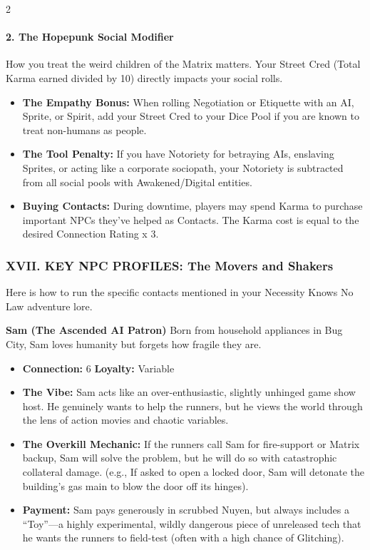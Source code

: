 \documentclass[
  oneside]{article}
\providecommand{\tightlist}{%
  \setlength{\itemsep}{0pt}\setlength{\parskip}{0pt}}
\begin{document}
\begin{multicols}{2}
\hypertarget{the-hopepunk-social-modifier}{%
\paragraph{2. The Hopepunk Social
Modifier}\label{the-hopepunk-social-modifier}}

How you treat the weird children of the Matrix
matters. Your Street Cred (Total Karma earned
divided by 10) directly impacts your social rolls.

\begin{itemize}
\tightlist
\item
  \textbf{The Empathy Bonus:} When rolling
  Negotiation or Etiquette with an AI, Sprite, or
  Spirit, add your Street Cred to your Dice Pool
  if you are known to treat non-humans as people.
\item
  \textbf{The Tool Penalty:} If you have Notoriety
  for betraying AIs, enslaving Sprites, or acting
  like a corporate sociopath, your Notoriety is
  subtracted from all social pools with
  Awakened/Digital entities.
\item
  \textbf{Buying Contacts:} During downtime,
  players may spend Karma to purchase important
  NPCs they've helped as Contacts. The Karma cost
  is equal to the desired Connection Rating x 3.
\end{itemize}

\hypertarget{xvii.-key-npc-profiles-the-movers-and-shakers}{%
\subsubsection{XVII. KEY NPC PROFILES: The Movers
and
Shakers}\label{xvii.-key-npc-profiles-the-movers-and-shakers}}

Here is how to run the specific contacts mentioned
in your Necessity Knows No Law adventure lore.

\textbf{Sam (The Ascended AI Patron)} Born from
household appliances in Bug City, Sam loves
humanity but forgets how fragile they are.

\begin{itemize}
\tightlist
\item
  \textbf{Connection:} 6 \textbar{}
  \textbf{Loyalty:} Variable
\item
  \textbf{The Vibe:} Sam acts like an
  over-enthusiastic, slightly unhinged game show
  host. He genuinely wants to help the runners,
  but he views the world through the lens of
  action movies and chaotic variables.
\item
  \textbf{The Overkill Mechanic:} If the runners
  call Sam for fire-support or Matrix backup, Sam
  will solve the problem, but he will do so with
  catastrophic collateral damage. (e.g., If asked
  to open a locked door, Sam will detonate the
  building's gas main to blow the door off its
  hinges).
\item
  \textbf{Payment:} Sam pays generously in
  scrubbed Nuyen, but always includes a
  ``Toy''---a highly experimental, wildly
  dangerous piece of unreleased tech that he wants
  the runners to field-test (often with a high
  chance of Glitching).
\end{itemize}


\end{multicols}
\end{document}
